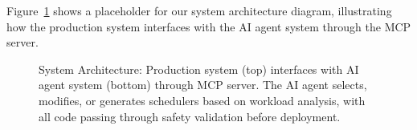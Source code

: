 Figure~\ref{fig:architecture} shows a placeholder for our system architecture diagram, illustrating how the production system interfaces with the AI agent system through the MCP server.

\begin{figure}[h]
\centering
{}
\caption{System Architecture: Production system (top) interfaces with AI agent system (bottom) through MCP server. The AI agent selects, modifies, or generates schedulers based on workload analysis, with all code passing through safety validation before deployment.}
\label{fig:architecture}
\end{figure}